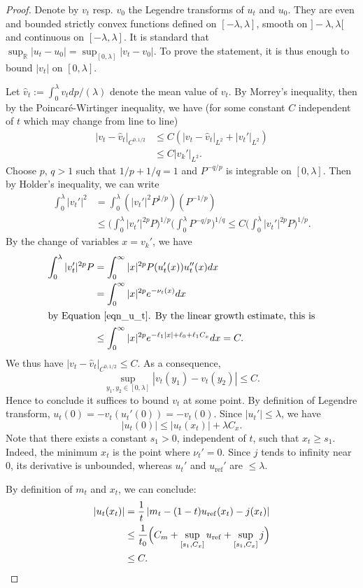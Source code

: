\documentclass[10pt]{amsart}
\theoremstyle{plain}
\theoremstyle{definition}
\begin{document}
\begin{proof}
Denote by $v_t$ resp. $v_0$ the Legendre transforms
of $u_t$ and $u_0$. They are even and bounded strictly
convex functions defined on $[-\lambda,\lambda]$, smooth on $]-\lambda,\lambda[$
and continuous on $[-\lambda,\lambda]$.
It is standard that $\sup_{\mathbb{R}}|u_t-u_0| = \sup_{[0,\lambda]} |v_t-v_0|$.
To prove the statement, it is thus enough
to bound $|v_t|$ on $[0,\lambda]$.

Let $\hat{v}_t:=\int_0^{\lambda}v_tdp/(\lambda)$ denote the mean value of $v_t$.
By Morrey's inequality, then by the Poincaré-Wirtinger inequality, we have (for some
constant $C$ independent of $t$ which may change from line to line)
\begin{align*}
|v_t-\hat{v}_t|_{C^{0,1/2}} &\leq C \left(|v_t-\hat{v}_t|_{L^{2}}+|v_t'|_{L^{2}}\right) \\
& \leq C |v_k'|_{L^{2}}.
\end{align*}
Choose $p$, $q>1$ such that $1/p+1/q=1$ and $P^{-q/p}$ is integrable on $[0,\lambda]$.
Then by Holder's inequality, we can write
\begin{align*}
\int_0^{\lambda} |v_t'|^2 & = \int_0^{\lambda} (|v_t'|^2P^{1/p}) (P^{-1/p}) \\
&\leq \biggl(\int_0^{\lambda} |v_t'|^{2p}P\biggr)^{1/p}\biggl(\int_0^{\lambda} P^{-q/p}\biggr)^{1/q} \leq C \biggl(\int_0^{\lambda} |v_t'|^{2p}P\biggr)^{1/p}.
\end{align*}
By the change of variables $x=v_k'$, we have
\begin{align*}
\int_0^{\lambda} |v_t'|^{2p}P & = \int_0^{\infty} |x|^{2p} P(u_t'(x))u_t''(x) dx \\
& = \int_0^{\infty} |x|^{2p} e^{-\nu_t(x)}dx \\
\intertext{by Equation~\eqref{eqn_u_t}. By the linear growth estimate, this is}
& \leq \int_0^{\infty} |x|^{2p} e^{-\ell_1|x|+\ell_0+\ell_1C_x} dx = C.
\end{align*}
We thus have $|v_t-\hat{v}_t|_{C^{0,1/2}} \leq C$.
As a consequence,
\begin{equation*}
\sup_{y_1,y_2\in [0,\lambda]} |v_t(y_1)-v_t(y_2)| \leq C.
\end{equation*}
Hence to conclude it suffices to bound $v_t$ at some point.
By definition of Legendre transform, $u_t(0)=-v_t(u_t'(0))=-v_t(0)$.
Since $|u_t'|\leq \lambda$, we have
\begin{equation*}
|u_t(0)|\leq |u_t(x_t)|+\lambda C_x.
\end{equation*}
Note that there exists a constant $s_1>0$, independent of $t$, such that
$x_t\geq s_1$.
Indeed, the minimum $x_t$ is the point where $\nu_t'=0$.
Since $j$ tends to infinity near $0$, its derivative is unbounded,
whereas $u_t'$ and $u_{\mathrm{ref}}'$ are $\leq \lambda$.

By definition of $m_t$ and $x_t$, we can conclude:
\begin{align*}
|u_t(x_t)|&=\frac{1}{t}\left| m_t-(1-t)u_{\mathrm{ref}}(x_t)-j(x_t)\right| \\
& \leq \frac{1}{t_0}\Bigl( C_m+\sup_{[s_1,C_x]}u_{\mathrm{ref}}+\sup_{[s_1,C_x]}j \Bigr) \\
& \leq C.\qedhere
\end{align*}
\end{proof}
\end{document}
